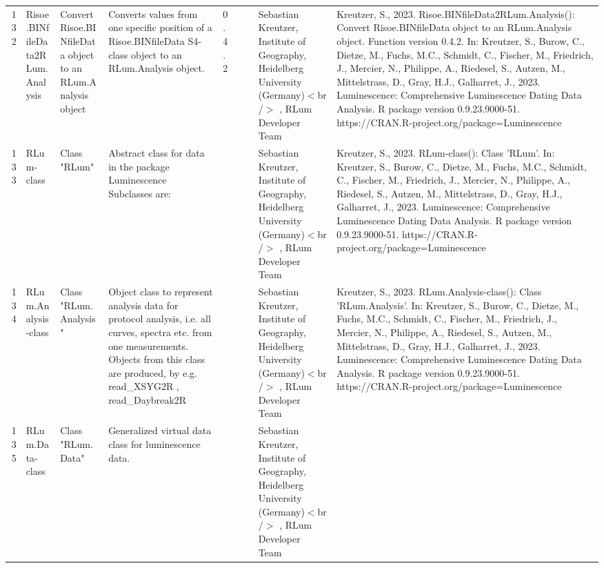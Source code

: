 \begin{table}[ht]
\begin{tabular}{rllllllll}
 \\ 
  132 & Risoe.BINfileData2RLum.Analysis & Convert Risoe.BINfileData object to an RLum.Analysis object & Converts values from one specific position of a Risoe.BINfileData S4-class object to an RLum.Analysis object. & 0.4.2
 &  &  & Sebastian Kreutzer, Institute of Geography, Heidelberg University (Germany)$<$br /$>$ , RLum Developer Team & Kreutzer, S., 2023. Risoe.BINfileData2RLum.Analysis(): Convert Risoe.BINfileData object to an RLum.Analysis object. Function version 0.4.2. In: Kreutzer, S., Burow, C., Dietze, M., Fuchs, M.C., Schmidt, C., Fischer, M., Friedrich, J., Mercier, N., Philippe, A., Riedesel, S., Autzen, M., Mittelstrass, D., Gray, H.J., Galharret, J., 2023. Luminescence: Comprehensive Luminescence Dating Data Analysis. R package version 0.9.23.9000-51. https://CRAN.R-project.org/package=Luminescence
 \\ 
  133 & RLum-class & Class  "RLum" & Abstract class for data in the package Luminescence Subclasses are: &  &  &  & Sebastian Kreutzer, Institute of Geography, Heidelberg University (Germany)$<$br /$>$ , RLum Developer Team & Kreutzer, S., 2023. RLum-class(): Class 'RLum'. In: Kreutzer, S., Burow, C., Dietze, M., Fuchs, M.C., Schmidt, C., Fischer, M., Friedrich, J., Mercier, N., Philippe, A., Riedesel, S., Autzen, M., Mittelstrass, D., Gray, H.J., Galharret, J., 2023. Luminescence: Comprehensive Luminescence Dating Data Analysis. R package version 0.9.23.9000-51. https://CRAN.R-project.org/package=Luminescence
 \\ 
  134 & RLum.Analysis-class & Class  "RLum.Analysis" & Object class to represent analysis data for protocol analysis, i.e. all curves, spectra etc. from one measurements. Objects from this class are produced, by e.g.  read\_XSYG2R ,  read\_Daybreak2R &  &  &  & Sebastian Kreutzer, Institute of Geography, Heidelberg University (Germany)$<$br /$>$ , RLum Developer Team & Kreutzer, S., 2023. RLum.Analysis-class(): Class 'RLum.Analysis'. In: Kreutzer, S., Burow, C., Dietze, M., Fuchs, M.C., Schmidt, C., Fischer, M., Friedrich, J., Mercier, N., Philippe, A., Riedesel, S., Autzen, M., Mittelstrass, D., Gray, H.J., Galharret, J., 2023. Luminescence: Comprehensive Luminescence Dating Data Analysis. R package version 0.9.23.9000-51. https://CRAN.R-project.org/package=Luminescence
 \\ 
  135 & RLum.Data-class & Class  "RLum.Data" & Generalized virtual data class for luminescence data. &  &  &  & Sebastian Kreutzer, Institute of Geography, Heidelberg University (Germany)$<$br /$>$ , RLum Developer Team &  \\ 

\end{tabular}
\end{table}
